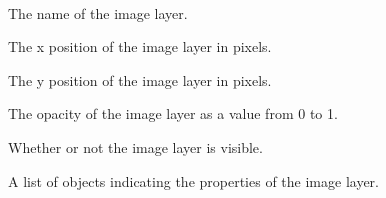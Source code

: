 \documentclass[letterpaper,10pt,english]{sphinxmanual}
\begin{document}

\begin{fulllineitems}
\label{index:tmx.ImageLayer}~

\begin{fulllineitems}
\label{index:tmx.ImageLayer.name}
The name of the image layer.

\end{fulllineitems}


\begin{fulllineitems}
\label{index:tmx.ImageLayer.offsetx}
The x position of the image layer in pixels.

\end{fulllineitems}


\begin{fulllineitems}
\label{index:tmx.ImageLayer.offsety}
The y position of the image layer in pixels.

\end{fulllineitems}


\begin{fulllineitems}
\label{index:tmx.ImageLayer.opacity}
The opacity of the image layer as a value from 0 to 1.

\end{fulllineitems}


\begin{fulllineitems}
\label{index:tmx.ImageLayer.visible}
Whether or not the image layer is visible.

\end{fulllineitems}


\begin{fulllineitems}
\label{index:tmx.ImageLayer.properties}
A list of {\hyperref[index:tmx.Property]{\emph{}}} objects indicating the properties of
the image layer.


\end{fulllineitems}
\end{fulllineitems}
\end{document}

